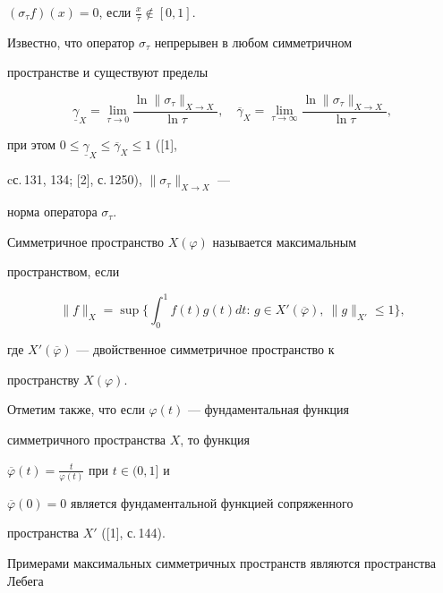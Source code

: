 $(\sigma_{\tau}f)(x)=0$, если $\frac{x}{\tau}\notin [0, 1]$.





Известно, что оператор $\sigma_{\tau}$ непрерывен в любом симметричном 


пространстве и существуют пределы


$$


\underline{\gamma}_{X}=\lim_{\tau\rightarrow 0}\frac{\ln 


\|\sigma_{\tau}\|_{X\rightarrow X}}{\ln \tau},\quad 


\overline{\gamma}_{X}=\lim_{\tau\rightarrow \infty}\frac{\ln 


\|\sigma_{\tau}\|_{X\rightarrow X}}{\ln \tau},


$$


при этом $0\leq \underline{\gamma}_{X}\leq\overline{\gamma}_{X}\leq 1$ ([1], 


cс.\,131, 134; [2], с.\,1250), $\|\sigma_{\tau}\|_{X\rightarrow X}$ ---


норма оператора $\sigma_{\tau}$.





Симметричное пространство $X(\varphi)$ называется максимальным 


пространством, если 


$$


\|f\|_X=


\sup\bigg\{\int_0^1 f(t)g(t)dt :\, g \in 


X'(\overline{\varphi}),\ \|g\|_{X'} \le 1 \bigg\},


$$


где $X'(\overline{\varphi}) $ --- двойственное симметричное пространство к 


пространству $X(\varphi) $.


Отметим также, что если $\varphi(t)$ --- фундаментальная функция 


симметричного пространства $X$, то функция 


$\overline{\varphi}(t)=\frac{t}{\varphi(t)}$ при $t \in (0,1]$ и 


$\overline{\varphi}(0)=0$ является фундаментальной функцией сопряженного 


пространства $X'$ ([1], с.\,144).





Примерами максимальных симметричных пространств являются пространства Лебега 


